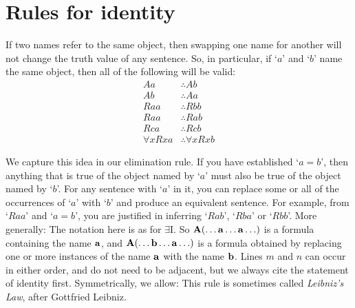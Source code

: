 %



\chapter{Rules for identity}
If two names refer to the same object, then swapping one name for another will not change the truth value of any sentence. So, in particular, if `$a$' and `$b$' name the same object, then all of the following will be valid:\label{model.nonidentity}
	\begin{align*}
	 	Aa &\therefore Ab \\
	 	Ab &\therefore Aa \\
	 	Raa &\therefore Rbb\\
		Raa & \therefore Rab\\
		Rca &\therefore Rcb\\
		\forall x Rxa &\therefore \forall x Rxb
	\end{align*}

We capture this idea in our elimination rule. If you have established `$a=b$', then anything that is true of the object named by `$a$' must also be true of the object named by `$b$'. For any sentence with `$a$' in it, you can replace some or all of the occurrences of `$a$' with `$b$' and produce an equivalent sentence. For example, from `$Raa$' and `$a = b$', you are justified in inferring `$Rab$', `$Rba$' or `$Rbb$'. More generally:
The notation here is as for $\exists$I. So $\mathbf{A}(\ldots \mathbf{a} \ldots \mathbf{a}\ldots)$ is a formula containing the name $\mathbf{a}$, and $\mathbf{A}(\ldots \mathbf{b} \ldots \mathbf{a}\ldots)$ is a formula obtained by replacing one or more instances of the name $\mathbf{a}$ with the name $\mathbf{b}$. Lines $m$ and $n$ can occur in either order, and do not need to be adjacent, but we always cite the statement of identity first. Symmetrically, we allow:
This rule is sometimes called \emph{Leibniz's Law}, after Gottfried Leibniz. 	
	

